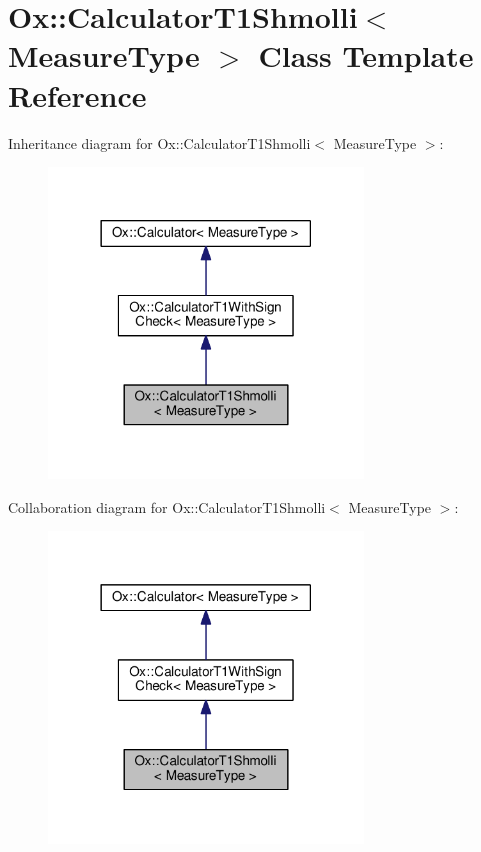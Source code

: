 \hypertarget{class_ox_1_1_calculator_t1_shmolli}{}\section{Ox\+:\+:Calculator\+T1\+Shmolli$<$ Measure\+Type $>$ Class Template Reference}
\label{class_ox_1_1_calculator_t1_shmolli}


Inheritance diagram for Ox\+:\+:Calculator\+T1\+Shmolli$<$ Measure\+Type $>$\+:
\nopagebreak
\begin{figure}[H]
\begin{center}
\leavevmode
\includegraphics[width=237pt]{class_ox_1_1_calculator_t1_shmolli__inherit__graph}
\end{center}
\end{figure}


Collaboration diagram for Ox\+:\+:Calculator\+T1\+Shmolli$<$ Measure\+Type $>$\+:
\nopagebreak
\begin{figure}[H]
\begin{center}
\leavevmode
\includegraphics[width=237pt]{class_ox_1_1_calculator_t1_shmolli__coll__graph}
\end{center}
\end{figure}
